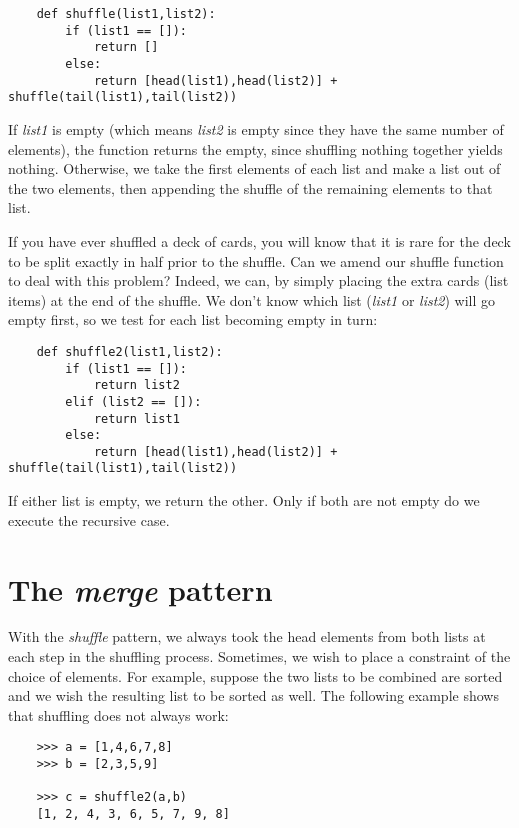 \begin{verbatim}
    def shuffle(list1,list2):
        if (list1 == []):
            return []
        else:
            return [head(list1),head(list2)] + shuffle(tail(list1),tail(list2))
\end{verbatim}

If {\it list1} is empty
(which means {\it list2} is empty since they have the same number of elements),
the function returns the empty, since shuffling nothing together
yields nothing.
Otherwise, we take the first elements of each list and make a list
out of the two elements, then appending the shuffle of
the remaining elements to that list.

If you have ever shuffled a deck of cards, you will know that it is
rare for the deck to be split exactly in half prior to the shuffle.
Can we amend our shuffle function to deal with this problem? Indeed,
we can,
by simply placing the extra cards (list items) at the end
of the shuffle. We don't know which list ({\it list1} or {\it list2})
will go empty first,
so we test for each list becoming empty in turn:

\begin{verbatim}
    def shuffle2(list1,list2):
        if (list1 == []):
            return list2
        elif (list2 == []):
            return list1
        else:
            return [head(list1),head(list2)] + shuffle(tail(list1),tail(list2))
\end{verbatim}

If either list is empty, we return the other. Only if both are
not empty do we execute the recursive case.
       
\section{The {\it merge} pattern}

With the {\it shuffle} pattern, we always took the head elements from both
lists at each step in the shuffling process.
Sometimes, we wish to place a constraint of the choice of elements.
For example, suppose the two lists to be combined are sorted
and we wish the resulting list to be sorted as well. The
following example shows that shuffling does not always work:

\begin{verbatim}
    >>> a = [1,4,6,7,8]
    >>> b = [2,3,5,9]

    >>> c = shuffle2(a,b)
    [1, 2, 4, 3, 6, 5, 7, 9, 8]
\end{verbatim}

